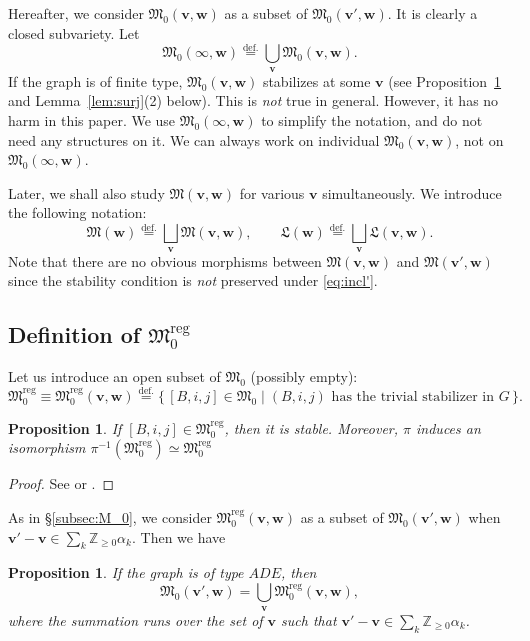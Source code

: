 \documentclass[12pt]{amsart}
\def\Bbb{\mathbb}
\def\frak{\mathfrak}
\newtheorem{Proposition}[equation]{Proposition}
\theoremstyle{definition}
\theoremstyle{remark}
\numberwithin{equation}{subsection}
\newcommand{\lemref}[1]{Lemma~\ref{#1}}
\newcommand{\propref}[1]{Proposition~\ref{#1}}
\newcommand{\subsecref}[1]{\S\ref{#1}}
\newcommand{\defeq}{\overset{\operatorname{\scriptstyle def.}}{=}}
\newcommand{\Z}{{\Bbb Z}}
\newcommand{\M}{{\frak M}} %
\newcommand{\Mreg}{{\frak M_0^{\operatorname{reg}}}}
\newcommand{\La}{{\frak L}} %
\newcommand{\bv}{{\mathbf v}} %
\newcommand{\bw}{{\mathbf w}} %
\newcommand{\Mw}{\M(\bw)}
\newcommand{\Law}{\La(\bw)}
\begin{document}
Hereafter, we consider $\M_0(\bv,\bw)$ as a subset of
$\M_0(\bv',\bw)$. It is clearly a closed subvariety. Let
\begin{equation}
\label{eq:union}
   \M_0(\infty,\bw) \defeq \bigcup_{\bv} \M_0(\bv,\bw).
\end{equation}
If the graph is of finite type, $\M_0(\bv,\bw)$ stabilizes at some
$\bv$ (see \propref{prop:ADE} and \lemref{lem:surj}(2) below).
%
This is {\it not\/} true in general. However, it has no harm in
this paper. We use $\M_0(\infty,\bw)$ to simplify the notation, and do
not need any structures on it.
%
We can always work on individual $\M_0(\bv,\bw)$,
not on $\M_0(\infty,\bw)$.

Later, we shall also study $\M(\bv,\bw)$ for various
$\bv$ simultaneously. We introduce the following notation:
\begin{equation*}
   \Mw \defeq \bigsqcup_{\bv}\M(\bv,\bw), \qquad
   \Law \defeq \bigsqcup_{\bv}\La(\bv,\bw).
\end{equation*}
Note that there are no obvious morphisms between
$\M(\bv,\bw)$ and $\M(\bv',\bw)$ since the stability condition is {\it 
not\/} preserved under \eqref{eq:incl'}.

\subsection{Definition of $\Mreg$}

Let us introduce an open subset of $\M_0$ (possibly empty):
\begin{equation}\label{quiver:reg}
  \Mreg \equiv \Mreg(\bv,\bw) \defeq \{\, [B, i, j]\in \M_0\mid
  \text{$(B, i, j)$ has the trivial stabilizer in $G$}\,\}.
\end{equation}

\begin{Proposition}\label{prop:pi_isom}
If $[B, i, j]\in \Mreg$, then it is stable.
Moreover, $\pi$ induces an isomorphism 
$\pi^{-1}(\Mreg)\simeq \Mreg$
\end{Proposition}

\begin{proof}
See \cite[3.24]{Na-alg} or \cite[4.1(2)]{Na-quiver}.
\end{proof}

As in \subsecref{subsec:M_0}, we consider $\Mreg(\bv,\bw)$ as a subset 
of $\M_0(\bv',\bw)$ when $\bv' - \bv \in \sum_k \Z_{\ge 0}
\alpha_k$. Then we have
\begin{Proposition}\label{prop:ADE}
If the graph is of type $ADE$, then
\begin{equation*}
   \M_0(\bv',\bw) = \bigcup_{\bv} \Mreg(\bv,\bw),
\end{equation*}
where the summation runs over the set of $\bv$ such that
$\bv' - \bv \in \sum_k \Z_{\ge 0}\alpha_k$.
\end{Proposition}
\end{document}

